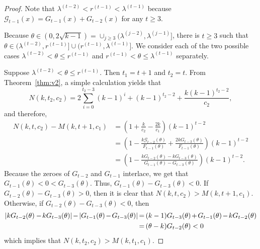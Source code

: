\documentclass[ALCO,ThmDefs,Unicode,epreuves]{cedram}
\newcommand*{\Mk}{\mkern -2mu}
\begin{document}
\begin{proof}
Note that $\lambda^{(t-2)} < r^{(t-1)} < \lambda^{(t-1)}$ because $\mathcal{G}_{t-1}(x)=G_{t-1}(x)+G_{t-2}(x)$ for any $t\geq 3$.

Because $\theta \in (0,2\sqrt{k-1})=\cup_{j\geq 3}(\lambda^{(j-2)},\lambda^{(j-1)}]$, there is $t\geq 3$ such that $\theta\in (\lambda^{(t-2)},r^{(t-1)}]\cup (r^{(t-1)},\lambda^{(t-1)}]$. We consider each of the two possible cases $\lambda^{(t-2)}<\theta \leq r^{(t-1)}$ and $r^{(t-1)} < \theta \leq \lambda^{(t-1)} $ separately.

Suppose $\lambda^{(t-2)}<\theta \leq r^{(t-1)}$. Then $t_1=t+1$ and $t_2=t$. From Theorem~\ref{thm:v2}, a simple calculation yields that
\[
N(k,t_2,c_2)=2\sum_{i=0}^{t_2-3}(k-1)^i+(k-1)^{t_2-2}+\frac{k(k-1)^{t_2-2}}{c_2},
\]
and therefore, 
\begin{align*}
N(k,t,c_2)-M(k,t+1,c_1)&=\left(1+\frac{k}{c_2}-\frac{2k}{c_1} \right)(k-1)^{t-2}\\
&=\left(1-\frac{k\mathcal{G}_{t-2}(\theta)}{F_{t-1}(\theta)}+\frac{2kG_{t-3}(\theta)}{F_{t-1}(\theta)}\right)(k-1)^{t-2}\\
&=\left(1-\frac{kG_{t-2}(\theta)-kG_{t-3}(\theta)}{G_{t-1}(\theta)-G_{t-3}(\theta)}\right)(k-1)^{t-2}.
\end{align*}
Because the zeroes of $G_{t-2}$ and $G_{t-1}$ interlace, we get that $G_{t-1}(\theta)<0<G_{t-3}(\theta)$. Thus, $G_{t-1}(\theta)-G_{t-3}(\theta)<0$. If $G_{t-2}(\theta)-G_{t-3}(\theta)>0$, then it is clear that $N(k,t,c_2)>M(k,t+1,c_1)$. Otherwise, if 
$G_{t-2}(\theta)-G_{t-3}(\theta)<0$, then 
\begin{align*}
|kG_{t-2}(\theta)-\Mk kG_{t-3}(\theta)|\Mk -\Mk |G_{t-1}(\theta)\Mk -\Mk G_{t-3}(\theta)|
&\Mk =\Mk (k-1)G_{t-3}(\theta)\Mk +\Mk G_{t-1}(\theta)\Mk -\Mk kG_{t-2}(\theta)\\
&\Mk =\Mk (\theta - k)G_{t-2}(\theta)<0 
\end{align*}
which implies that $N(k,t_2,c_2)>M(k,t_1,c_1)$. 


\end{proof}
\end{document}
